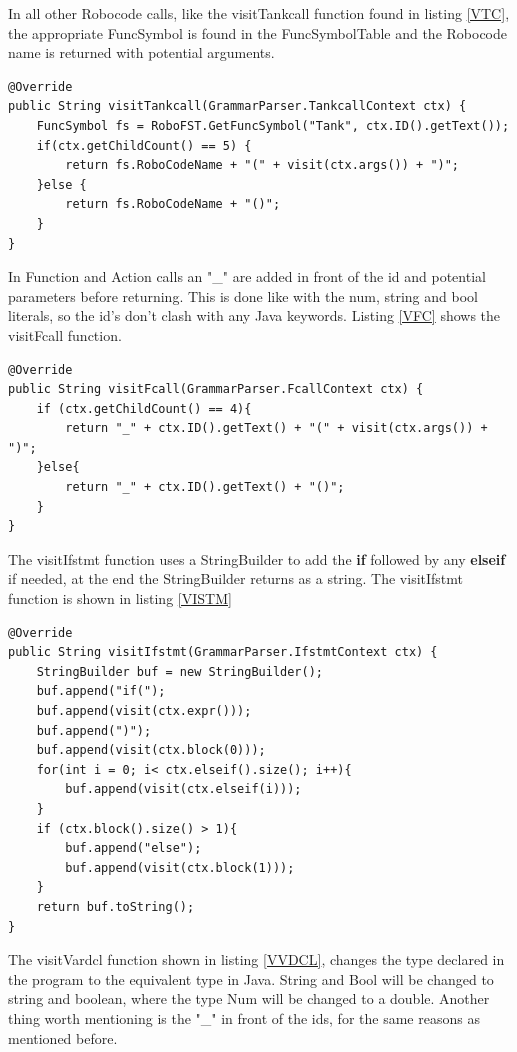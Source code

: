 In all other Robocode calls, like the visitTankcall function found in listing \ref{VTC}, the appropriate FuncSymbol is found in the FuncSymbolTable and the Robocode name is returned with potential arguments.

\begin{lstlisting}[caption={CodeGen - visitTankcall function}, label={VTC}]
@Override
public String visitTankcall(GrammarParser.TankcallContext ctx) {
    FuncSymbol fs = RoboFST.GetFuncSymbol("Tank", ctx.ID().getText());
    if(ctx.getChildCount() == 5) {
        return fs.RoboCodeName + "(" + visit(ctx.args()) + ")";
    }else {
        return fs.RoboCodeName + "()";
    }
}
\end{lstlisting}

In Function and Action calls an "\_" are added in front of the id and potential parameters before returning. This is done like with the num, string and bool literals, so the id's don't clash with any Java keywords. Listing \ref{VFC} shows the visitFcall function.

\begin{lstlisting}[caption={CodeGen - visitFcall function}, label={VFC}]
@Override
public String visitFcall(GrammarParser.FcallContext ctx) {
    if (ctx.getChildCount() == 4){
        return "_" + ctx.ID().getText() + "(" + visit(ctx.args()) + ")";
    }else{
        return "_" + ctx.ID().getText() + "()";
    }
}
\end{lstlisting}

The visitIfstmt function uses a StringBuilder to add the \textbf{if} followed by any \textbf{elseif} if needed, at the end the StringBuilder returns as a string. The visitIfstmt function is shown in listing \ref{VISTM}

\begin{lstlisting}[caption={CodeGen - visitIfstmt function}, label={VISTM}]
@Override
public String visitIfstmt(GrammarParser.IfstmtContext ctx) {
    StringBuilder buf = new StringBuilder();
    buf.append("if(");
    buf.append(visit(ctx.expr()));
    buf.append(")");
    buf.append(visit(ctx.block(0)));
    for(int i = 0; i< ctx.elseif().size(); i++){
        buf.append(visit(ctx.elseif(i)));
    }
    if (ctx.block().size() > 1){
        buf.append("else");
        buf.append(visit(ctx.block(1)));
    }
    return buf.toString();
}
\end{lstlisting}

The visitVardcl function shown in listing \ref{VVDCL}, changes the type declared in the program to the equivalent type in Java. String and Bool will be changed to string and boolean, where the type Num will be changed to a double. Another thing worth mentioning is the "\_" in front of the ids, for the same reasons as mentioned before.


